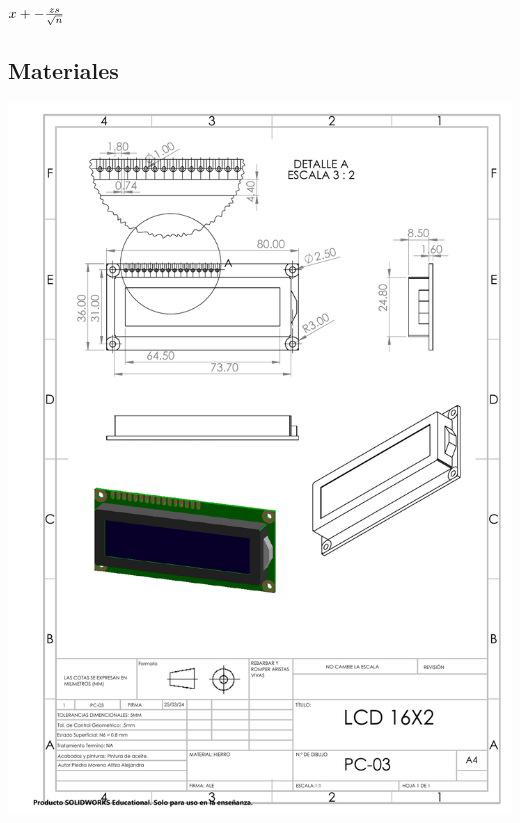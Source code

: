 \begin{center} 

${\-x}+-{\frac{zs}{\sqrt{n}}}$

\end{center}

\subsection{Materiales}

\begin{center}

\includegraphics[width=.9\textwidth]{22/img/lcdDibujo.PDF}~\\[15cm]


\end{center}

